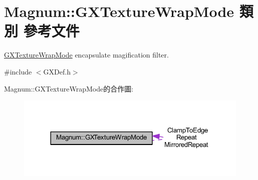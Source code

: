 \hypertarget{class_magnum_1_1_g_x_texture_wrap_mode}{}\section{Magnum\+:\+:G\+X\+Texture\+Wrap\+Mode 類別 參考文件}
\label{class_magnum_1_1_g_x_texture_wrap_mode}


\hyperlink{class_magnum_1_1_g_x_texture_wrap_mode}{G\+X\+Texture\+Wrap\+Mode} encapsulate magification filter.  




{\ttfamily \#include $<$G\+X\+Def.\+h$>$}



Magnum\+:\+:G\+X\+Texture\+Wrap\+Mode的合作圖\+:\nopagebreak
\begin{figure}[H]
\begin{center}
\leavevmode
\includegraphics[width=317pt]{class_magnum_1_1_g_x_texture_wrap_mode__coll__graph}
\end{center}
\end{figure}
